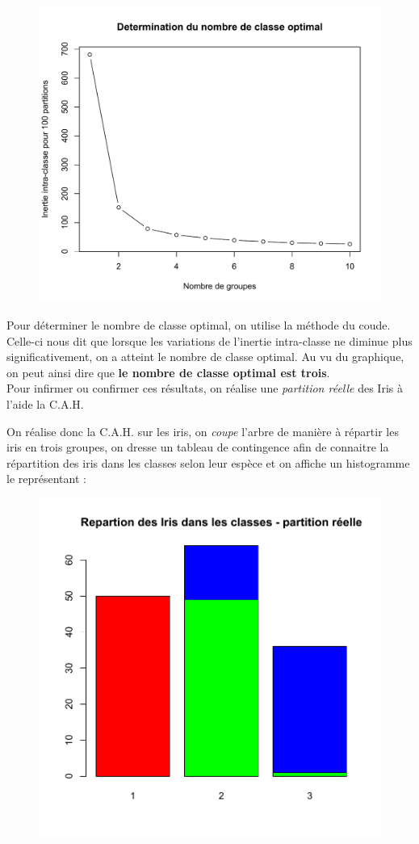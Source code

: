 \documentclass[a4paper,11pt]{article}
\begin{document}
\begin{figure}[H]
\begin{center}
\includegraphics[width=.6\textwidth]{img/classeopt}
\end{center}
\end{figure}

\noindent Pour déterminer le nombre de classe optimal, on utilise la méthode du coude. Celle-ci nous dit que lorsque les variations de l'inertie intra-classe ne diminue plus significativement, on a atteint le nombre de classe optimal. Au vu du graphique, on peut ainsi dire que \textbf{le nombre de classe optimal est trois}. \\

\noindent Pour infirmer ou confirmer ces résultats, on réalise une \textit{partition réelle} des Iris à l'aide la C.A.H.

\noindent On réalise donc la C.A.H. sur les iris, on \textit{coupe} l'arbre de manière à répartir les iris en trois groupes, on dresse un tableau de contingence afin de connaitre la répartition des iris dans les classes selon leur espèce et on affiche un histogramme le représentant : 

\begin{figure}[H]
\begin{center}
\includegraphics[width=.55\textwidth]{img/irispartreelle}
\end{center}
\end{figure}
\end{document}
